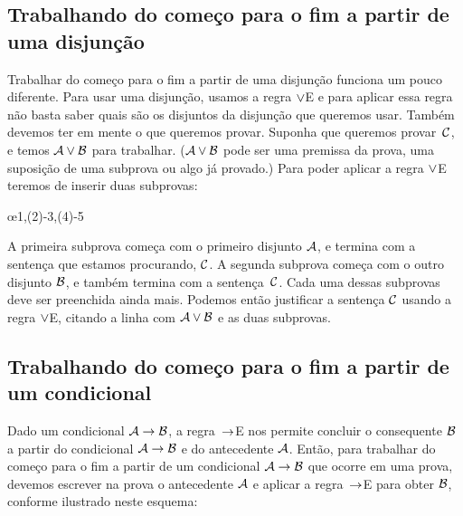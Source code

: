 \subsection*{Trabalhando do começo para o fim a partir de uma disjunção}

Trabalhar do começo para o fim a partir de uma disjunção funciona um pouco diferente. Para usar uma disjunção, usamos a regra $\vee$E e para aplicar essa regra não basta saber quais são os disjuntos da disjunção que queremos usar. Também devemos ter em mente o que queremos provar. Suponha que queremos provar~$\mathcal{C}$,  e temos $\mathcal{A} \vee \mathcal{B}$ para trabalhar. ($\mathcal{A} \vee \mathcal{B}$ pode ser uma premissa da prova, uma suposição de uma subprova ou algo já provado.) Para poder aplicar a regra $\vee$E teremos de inserir duas subprovas:
 

\begin{fitchproof}
	\open
	\ellipsesline 
	\close 
	\open
	\ellipsesline
	\close
	\oe{1,(2)-3,(4)-5} 
\end{fitchproof} 
A primeira subprova começa com o primeiro disjunto $\mathcal{A}$, e termina com a sentença que estamos procurando, $\mathcal{C}$. A segunda subprova começa com o outro disjunto $\mathcal{B}$, e também termina com  a sentença~$\mathcal{C}$. Cada uma dessas subprovas deve ser preenchida ainda mais. Podemos então justificar a sentença $\mathcal{C}$ usando a regra $\vee$E, citando a linha com $\mathcal{A} \vee \mathcal{B}$ e as duas subprovas.

\subsection*{ Trabalhando do começo para o fim a partir de um condicional}

 
Dado um condicional $\mathcal{A} \rightarrow \mathcal{B}$, a regra~$\rightarrow$E nos permite concluir o consequente $\mathcal{B}$ a partir do condicional $\mathcal{A} \rightarrow \mathcal{B}$ e do antecedente $\mathcal{A}$. Então, para trabalhar do começo para o fim a partir de um condicional $\mathcal{A} \rightarrow \mathcal{B}$ que ocorre em uma prova, devemos escrever na prova o antecedente $\mathcal{A}$ e aplicar a regra~$\rightarrow$E para obter $\mathcal{B}$, conforme ilustrado neste esquema:

\begin{fitchproof}
	\ellipsesline 
\end{fitchproof}

